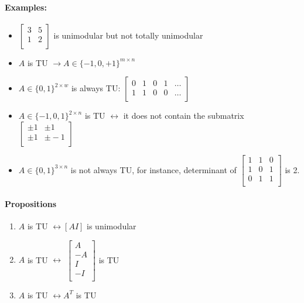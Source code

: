 \documentclass[main]{subfiles}
\begin{document}
\paragraph{Examples:}
\begin{itemize}
\item
$\begin{bmatrix}
3 & 5\\
1 & 2 \\
\end{bmatrix}$ is unimodular but not totally unimodular
\item $A$ is TU $\rightarrow A \in \{-1, 0, +1\}^{m \times n}$
\item $A \in \{0, 1\}^{2 \times w}$ is always TU: 
$\begin{bmatrix}
0 & 1 & 0 & 1 & \dots \\
1 & 1 & 0 & 0 & \dots \\
\end{bmatrix}$
\item $A \in \{-1, 0, 1\}^{2 \times n}$ is TU $\leftrightarrow$ it does not
contain the submatrix 
$\begin{bmatrix}
\pm 1 & \pm 1 \\
\pm 1 & \pm -1  \\
\end{bmatrix}$
\item $A \in \{0,1\}^{3 \times n}$ is not always TU, for instance, determinant
of 
$\begin{bmatrix}
1 & 1 & 0 \\
1 & 0 & 1 \\
0 & 1 & 1 \\
\end{bmatrix}$ is 2.
\end{itemize}

\paragraph{Propositions}
\begin{enumerate}
\item $A$ is TU $\leftrightarrow [AI]$ is unimodular
\item $A$ is TU $\leftrightarrow$
$\begin{bmatrix}
A \\
-A \\
I \\
-I \\
\end{bmatrix}$ is TU
\item $A$ is TU $\leftrightarrow A^{T}$ is TU
\end{enumerate}
\end{document}
